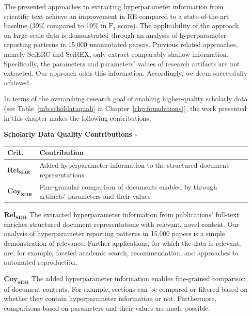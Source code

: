 The presented approaches to extracting hyperparameter information from scientific text achieve an improvement in RE compared to a state-of-the-art baseline (39\% compared to 10\% in $\text{F}_1$ score). The applicability of the approach on large-scale data is demonstrated through an analysis of hyperparameter reporting patterns in 15,000 unannotated papers. Previous related approaches, namely SciERC and SciREX, only extract comparably shallow information. Specifically, the parameters and parameters' values of research artifacts are not extracted. Our approach adds this information. Accordingly, we deem  successfully achieved.

In terms of the overarching research goal of enabling higher-quality scholarly data (see Table~\ref{tab:scholdataquali} in Chapter~\ref{chp:foundations}), the work presented in this chapter makes the following contributions.

\begin{infobox-progress}
      \textbf{Scholarly Data Quality Contributions - \cite{Saier2023hyperpie}}

      \begin{tabular}{lp{10.9cm}}
        \toprule
        Crit. & Contribution \\
        \midrule
        $\mathbf{Rel_{SDR}}$ & Added hyperparameter information to the structured document representations \\
        $\mathbf{Coy_{SDR}}$ & Fine-granular comparison of documents enabled by through artifacts' parameters and their values \\
        \bottomrule
      \end{tabular}
\end{infobox-progress}

$\mathbf{Rel_{SDR}}$ The extracted hyperparameter information from publications' full-text enriches structured document representations with relevant, novel content. Our analysis of hyperparameter reporting patterns in 15,000 papers is a simple demonstration of relevance. Further applications, for which the data is relevant, are, for example, faceted academic search, recommendation, and approaches to automated reproduction.

$\mathbf{Coy_{SDR}}$ The added hyperparameter information enables fine-grained comparison of document contents. For example, sections can be compared or filtered based on whether they contain hyperparameter information or not. Furthermore, comparisons based on parameters and their values are made possible.
